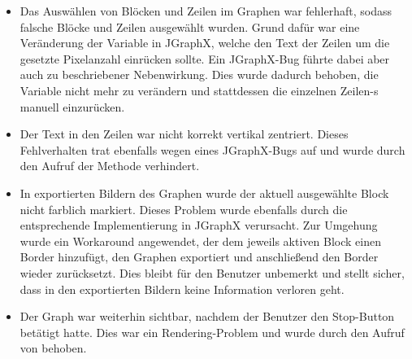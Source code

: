 \begin{itemize}
  \item Das Auswählen von Blöcken und Zeilen im Graphen war fehlerhaft, sodass falsche Blöcke und Zeilen ausgewählt wurden.
        Grund dafür war eine Veränderung der Variable  in JGraphX, welche den Text der Zeilen um die gesetzte Pixelanzahl einrücken sollte.
        Ein JGraphX-Bug führte dabei aber auch zu beschriebener Nebenwirkung.
        Dies wurde dadurch behoben, die Variable nicht mehr zu verändern und stattdessen die einzelnen Zeilen-s manuell einzurücken.
  \item Der Text in den Zeilen war nicht korrekt vertikal zentriert.
        Dieses Fehlverhalten trat ebenfalls wegen eines JGraphX-Bugs auf und wurde durch den Aufruf der Methode  verhindert.
  \item In exportierten Bildern des Graphen wurde der aktuell ausgewählte Block nicht farblich markiert.
        Dieses Problem wurde ebenfalls durch die entsprechende Implementierung in JGraphX verursacht.
        Zur Umgehung wurde ein Workaround angewendet, der dem jeweils aktiven Block einen Border hinzufügt, den Graphen exportiert und anschließend den Border wieder zurücksetzt.
        Dies bleibt für den Benutzer unbemerkt und stellt sicher, dass in den exportierten Bildern keine Information verloren geht.
  \item Der Graph war weiterhin sichtbar, nachdem der Benutzer den Stop-Button betätigt hatte.
        Dies war ein Rendering-Problem und wurde durch den Aufruf von  behoben.
\end{itemize}

